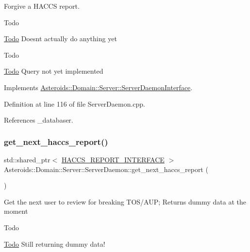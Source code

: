Forgive a H\+A\+C\+CS report. 

\begin{DoxyRefDesc}{Todo}
\item[\hyperlink{todo__todo000010}{Todo}]Doesn\textquotesingle{}t actually do anything yet \end{DoxyRefDesc}
\begin{DoxyRefDesc}{Todo}
\item[\hyperlink{todo__todo000011}{Todo}]Query not yet implemented \end{DoxyRefDesc}


Implements \hyperlink{classAsteroids_1_1Domain_1_1Server_1_1ServerDaemonInterface_aae0ae0d5ad7b042a8abddb268072b91e}{Asteroids\+::\+Domain\+::\+Server\+::\+Server\+Daemon\+Interface}.



Definition at line 116 of file Server\+Daemon.\+cpp.



References \+\_\+databaser.

\mbox{\label{classAsteroids_1_1Domain_1_1Server_1_1ServerDaemon_a53548491d0700fffff3730f3c48525d6}} 
\subsubsection{\texorpdfstring{get\+\_\+next\+\_\+haccs\+\_\+report()}{get\_next\_haccs\_report()}}
{\footnotesize\ttfamily std\+::shared\+\_\+ptr$<$ \hyperlink{classAsteroids_1_1Domain_1_1Server_1_1HACCS__REPORT__INTERFACE}{H\+A\+C\+C\+S\+\_\+\+R\+E\+P\+O\+R\+T\+\_\+\+I\+N\+T\+E\+R\+F\+A\+CE} $>$ Asteroids\+::\+Domain\+::\+Server\+::\+Server\+Daemon\+::get\+\_\+next\+\_\+haccs\+\_\+report (\begin{DoxyParamCaption}{ }\end{DoxyParamCaption})\hspace{0.3cm}{\ttfamily [virtual]}}

Get the next user to review for breaking T\+O\+S/\+A\+UP; Returns dummy data at the moment \begin{DoxyRefDesc}{Todo}
\item[\hyperlink{todo__todo000009}{Todo}]Still returning dummy data! \end{DoxyRefDesc}



